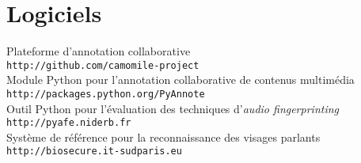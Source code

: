\section{Logiciels}

Plateforme d'annotation collaborative\\
\texttt{\small http://github.com/camomile-project}\\

Module Python pour l'annotation collaborative de contenus multim\'{e}dia\\
\texttt{\small http://packages.python.org/PyAnnote}\\

Outil Python pour l'\'{e}valuation des techniques d'\emph{audio fingerprinting}\\
\texttt{\small http://pyafe.niderb.fr} \cite{Ramona2011}\\

Syst\`{e}me de r\'{e}f\'{e}rence pour la reconnaissance des visages parlants\\
\texttt{\small http://biosecure.it-sudparis.eu} \cite{Bredin2006a}

